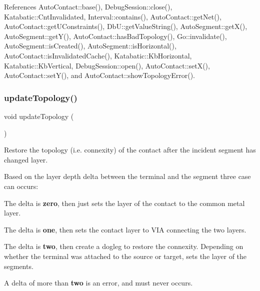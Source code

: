 References Auto\+Contact\+::base(), Debug\+Session\+::close(), Katabatic\+::\+Cnt\+Invalidated, Interval\+::contains(), Auto\+Contact\+::get\+Net(), Auto\+Contact\+::get\+U\+Constraints(), Db\+U\+::get\+Value\+String(), Auto\+Segment\+::get\+X(), Auto\+Segment\+::get\+Y(), Auto\+Contact\+::has\+Bad\+Topology(), Go\+::invalidate(), Auto\+Segment\+::is\+Created(), Auto\+Segment\+::is\+Horizontal(), Auto\+Contact\+::is\+Invalidated\+Cache(), Katabatic\+::\+Kb\+Horizontal, Katabatic\+::\+Kb\+Vertical, Debug\+Session\+::open(), Auto\+Contact\+::set\+X(), Auto\+Contact\+::set\+Y(), and Auto\+Contact\+::show\+Topology\+Error().

\mbox{\label{classKatabatic_1_1AutoContactTerminal_af5bf1f5e71204ef84346e4e036175431}} 
\subsubsection{\texorpdfstring{update\+Topology()}{updateTopology()}}
{\footnotesize\ttfamily void update\+Topology (\begin{DoxyParamCaption}{ }\end{DoxyParamCaption})\hspace{0.3cm}{\ttfamily [virtual]}}

Restore the topology (i.\+e. connexity) of the contact after the incident segment has changed layer.

Based on the layer depth delta between the terminal and the segment three case can occurs\+:
\begin{DoxyItemize}
\item The delta is {\bfseries zero}, then just sets the layer of the contact to the common metal layer.
\item The delta is {\bfseries one}, then sets the contact layer to V\+IA connecting the two layers.
\item The delta is {\bfseries two}, then create a dogleg to restore the connexity. Depending on whether the terminal was attached to the source or target, sets the layer of the segments.
\item A delta of more than {\bfseries two} is an error, and must never occurs.
\end{DoxyItemize}

